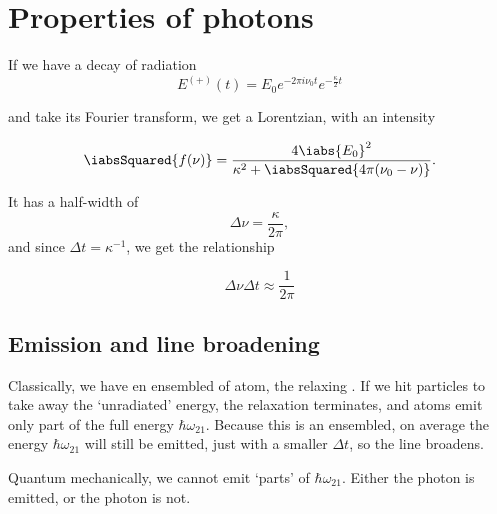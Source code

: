 \section{Properties of photons}
If we have a decay of radiation
\begin{equation}
  E^{(+)}(t) = E_0e^{-2\pi i \nu_0t}e^{-\frac{\kappa}{2}t}
\end{equation}

\noindent and take its Fourier transform,  we get a Lorentzian, with an
intensity

 \begin{equation}
   \iabsSquared{f(\nu)} = \frac{4\iabs{E_0}^2}{\kappa^2 + \iabsSquared{4\pi(\nu_0 - \nu)}}.
 \end{equation}

 \begin{framed}\noindent

   It has a half-width of
   \begin{equation}
     \Delta\nu = \frac{\kappa}{2\pi},
   \end{equation}
   \noindent and since $ \Delta t = \kappa^{-1} $, we get the relationship

  \begin{equation}
    \Delta\nu\Delta t \approx \frac{1}{2\pi}
  \end{equation}

\end{framed}

 \subsection{Emission and line broadening}
 Classically,   we   have   en   ensembled  of   atom,   the   relaxing
 \ira{}.   If   we  hit   particles  to  take   away  the
 `unradiated' energy,  the relaxation  terminates, and atoms  emit only
 part  of the  full energy  $ \hbar\omega_{21}  $. Because  this is  an
 ensembled, on  average the energy  $ \hbar\omega_{21} $ will  still be
 emitted, just with a smaller $ \Delta t $, so the line broadens.

 Quantum  mechanically, we  cannot emit  `parts' of  $ \hbar\omega_{21}
 $. Either the photon is emitted,  or the photon is not. 

